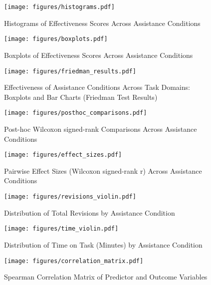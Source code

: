 \begin{figure}[htbp]
\centering
\texttt{[image: figures/histograms.pdf]}
\caption{Histograms of Effectiveness Scores Across Assistance Conditions}
\label{figure:histograms}
\end{figure}

\begin{figure}[htbp]
\centering
\texttt{[image: figures/boxplots.pdf]}
\caption{Boxplots of Effectiveness Scores Across Assistance Conditions}
\label{figure:boxplots}
\end{figure}

\begin{figure}[htbp]
\centering
\texttt{[image: figures/friedman\_results.pdf]}
\caption{Effectiveness of Assistance Conditions Across Task Domains: Boxplots and Bar Charts (Friedman Test Results)}
\label{figure:friedman_results}
\end{figure}

\begin{figure}[htbp]
\centering
\texttt{[image: figures/posthoc\_comparisons.pdf]}
\caption{Post-hoc Wilcoxon signed-rank Comparisons Across Assistance Conditions}
\label{figure:posthoc}
\end{figure}

\begin{figure}[htbp]
\centering
\texttt{[image: figures/effect\_sizes.pdf]}
\caption{Pairwise Effect Sizes (Wilcoxon signed-rank r) Across Assistance Conditions}
\label{figure:effect_sizes}
\end{figure}

\begin{figure}[htbp]
\centering
\texttt{[image: figures/revisions\_violin.pdf]}
\caption{Distribution of Total Revisions by Assistance Condition}
\label{figure:revisions}
\end{figure}

\begin{figure}[htbp]
\centering
\texttt{[image: figures/time\_violin.pdf]}
\caption{Distribution of Time on Task (Minutes) by Assistance Condition}
\label{figure:time_on_task}
\end{figure}

\begin{figure}[htbp]
\centering
\texttt{[image: figures/correlation\_matrix.pdf]}
\caption{Spearman Correlation Matrix of Predictor and Outcome Variables}
\label{figure:correlation_matrix}
\end{figure}

